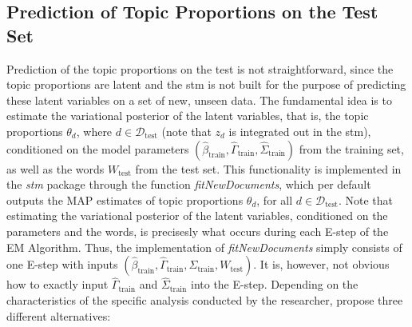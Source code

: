 \subsection{Prediction of Topic Proportions on the Test Set}

Prediction of the topic proportions on the test is not straightforward, since the topic proportions are latent and the stm is not built for the purpose of predicting these latent variables on a set of new, unseen data. The fundamental idea is to estimate the variational posterior of the latent variables, that is, the topic proportions $\theta_d$, where $d \in \mathcal{D}_{\text{test}}$ (note that $z_d$ is integrated out in the stm), conditioned on the model parameters $(\hat{\beta}_{\text{train}}, \hat{\Gamma}_{\text{train}}, \hat{\Sigma}_{\text{train}})$ from the training set, as well as the words $W_{\text{test}}$ from the test set. This functionality is implemented in the \textit{stm} package through the function \textit{fitNewDocuments}, which per default outputs the MAP estimates of topic proportions $\theta_d$, for all $d \in \mathcal{D}_{\text{test}}$. Note that estimating the variational posterior of the latent variables, conditioned on the parameters and the words, is precisesly what occurs during each E-step of the EM Algorithm. Thus, the implementation of \textit{fitNewDocuments} simply consists of one E-step with inputs $(\hat{\beta}_{\text{train}}, \hat{\Gamma}_{\text{train}}, \hat{\Sigma}_{\text{train}}, W_{\text{test}})$. It is, however, not obvious how to exactly input $\hat{\Gamma}_{\text{train}}$ and  $\hat{\Sigma}_{\text{train}}$ into the E-step. Depending on the characteristics of the specific analysis conducted by the researcher, \cite{egami2018make} propose three different alternatives:
